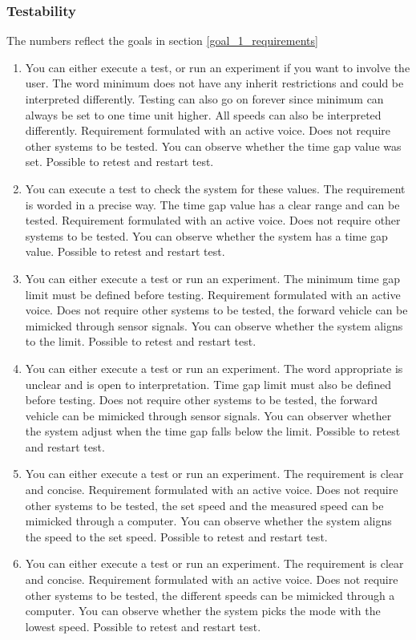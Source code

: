 \subsubsection{Testability}

The numbers reflect the goals in section \ref{goal_1_requirements}

\begin{enumerate}
    \item You can either execute a test, or run an experiment if you want to involve the user. The word minimum does not have any inherit restrictions and could be interpreted differently. Testing can also go on forever since minimum can always be set to one time unit higher. All speeds can also be interpreted differently. Requirement formulated with an active voice. Does not require other systems to be tested. You can observe whether the time gap value was set. Possible to retest and restart test.  
    \item You can execute a test to check the system for these values. The requirement is worded in a precise way. The time gap value has a clear range and can be tested. Requirement formulated with an active voice. Does not require other systems to be tested. You can observe whether the system has a time gap value. Possible to retest and restart test. 
    \item You can either execute a test or run an experiment. The minimum time gap limit must be defined before testing.  Requirement formulated with an active voice. Does not require other systems to be tested, the forward vehicle can be mimicked through sensor signals. You can observe whether the system aligns to the limit. Possible to retest and restart test.
    \item You can either execute a test or run an experiment. The word appropriate is unclear and is open to interpretation. Time gap limit must also be defined before testing. Does not require other systems to be tested, the forward vehicle can be mimicked through sensor signals. You can observer whether the system adjust when the time gap falls below the limit. Possible to retest and restart test.
    \item You can either execute a test or run an experiment. The requirement is clear and concise. Requirement formulated with an active voice. Does not require other systems to be tested, the set speed and the measured speed can be mimicked through a computer. You can observe whether the system aligns the speed to the set speed. Possible to retest and restart test.
    \item You can either execute a test or run an experiment. The requirement is clear and concise. Requirement formulated with an active voice. Does not require other systems to be tested, the different speeds can be mimicked through a computer. You can observe whether the system picks the mode with the lowest speed. Possible to retest and restart test.

\end{enumerate}
